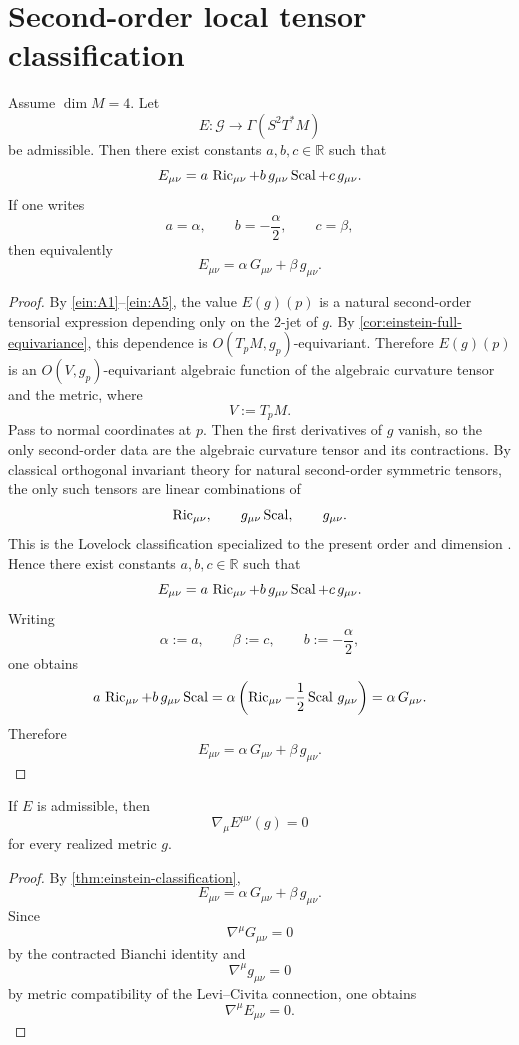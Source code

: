 \section{Second-order local tensor classification}
\label{sec:einstein-classification}
\begin{theorem}
	\label{thm:einstein-classification}
	Assume \(\dim M=4\).
	Let
	\[
		E:\mathcal G\to \Gamma(S^2T^*M)
	\]
	be admissible.
	Then there exist constants \(a,b,c\in\mathbb R\) such that
	\[
		E_{\mu\nu}
		=
		a\,\operatorname{Ric}_{\mu\nu}
		+
		b\,g_{\mu\nu}\operatorname{Scal}
		+
		c\,g_{\mu\nu}.
	\]
	If one writes
	\[
		a=\alpha,
		\qquad
		b=-\frac{\alpha}{2},
		\qquad
		c=\beta,
	\]
	then equivalently
	\[
		E_{\mu\nu}=\alpha\,G_{\mu\nu}+\beta\,g_{\mu\nu}.
	\]
\end{theorem}
\begin{proof}
	By \textup{\ref{ein:A1}}--\textup{\ref{ein:A5}}, the value \(E(g)(p)\)
	is a natural second-order tensorial expression depending only on the
	\(2\)-jet of \(g\).
	By \cref{cor:einstein-full-equivariance}, this dependence is
	\(O(T_pM,g_p)\)-equivariant.
	Therefore \(E(g)(p)\) is an \(O(V,g_p)\)-equivariant algebraic function
	of the algebraic curvature tensor and the metric, where
	\[
		V:=T_pM.
	\]
	Pass to normal coordinates at \(p\).
	Then the first derivatives of \(g\) vanish, so the only second-order
	data are the algebraic curvature tensor and its contractions.
	By classical orthogonal invariant theory for natural second-order
	symmetric tensors, the only such tensors are linear combinations of
	\[
		\operatorname{Ric}_{\mu\nu},
		\qquad
		g_{\mu\nu}\operatorname{Scal},
		\qquad
		g_{\mu\nu}.
	\]
	This is the Lovelock classification specialized to the present
	order and dimension \cite{Lovelock1971}.
	Hence there exist constants \(a,b,c\in\mathbb R\) such that
	\[
		E_{\mu\nu}
		=
		a\,\operatorname{Ric}_{\mu\nu}
		+
		b\,g_{\mu\nu}\operatorname{Scal}
		+
		c\,g_{\mu\nu}.
	\]
	Writing
	\[
		\alpha:=a,
		\qquad
		\beta:=c,
		\qquad
		b:=-\frac{\alpha}{2},
	\]
	one obtains
	\[
		a\,\operatorname{Ric}_{\mu\nu}+b\,g_{\mu\nu}\operatorname{Scal}
		=
		\alpha\left(
		\operatorname{Ric}_{\mu\nu}-\frac12\operatorname{Scal}\,g_{\mu\nu}
		\right)
		=
		\alpha\,G_{\mu\nu}.
	\]
	Therefore
	\[
		E_{\mu\nu}=\alpha\,G_{\mu\nu}+\beta\,g_{\mu\nu}.
	\]
\end{proof}
\begin{corollary}
	If \(E\) is admissible, then
	\[
		\nabla_\mu E^{\mu\nu}(g)=0
	\]
	for every realized metric \(g\).
\end{corollary}
\begin{proof}
	By \cref{thm:einstein-classification},
	\[
		E_{\mu\nu}=\alpha\,G_{\mu\nu}+\beta\,g_{\mu\nu}.
	\]
	Since
	\[
		\nabla^\mu G_{\mu\nu}=0
	\]
	by the contracted Bianchi identity and
	\[
		\nabla^\mu g_{\mu\nu}=0
	\]
	by metric compatibility of the Levi--Civita connection, one obtains
	\[
		\nabla^\mu E_{\mu\nu}=0.
	\]
\end{proof}
